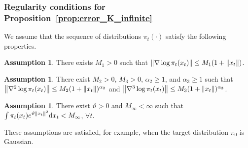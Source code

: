 \documentclass{article}
\theoremstyle{plain}
\theoremstyle{definition}
\newtheorem{assumption}[theorem]{Assumption}
\theoremstyle{remark}
\begin{document}
\subsubsection{Regularity conditions for Proposition~\ref{prop:error_K_infinite}}
\label{apx:regularity_conditions}
We assume that the sequence of distributions $\pi_t(\cdot)$ satisfy the following properties.
\begin{assumption}
	\label{asp:order1}
	There exists $M_1 > 0$ such that $\norm{\nabla\log \pi_t(x_t)} \leq M_1(1 + \norm{x_t})$.
\end{assumption}
\begin{assumption}
	\label{asp:order23}
	There exist $M_2 > 0$, $M_3 > 0$, $\alpha_2 \geq 1$, and $\alpha_3 \geq 1$ such that $\norm{\nabla^2\log \pi_t(x_t)} \leq M_2(1+\norm{x_t})^{\alpha_2}$ and $\norm{\nabla^3 \log\pi_t(x_t)} \leq M_3(1 + \norm{x_t})^{\alpha_3}$.
\end{assumption}
\begin{assumption}
	\label{asp:tail}
	There exist $\vartheta>0$ and $M_\infty < \infty$ such that $\int \pi_t(x_t) e^{\vartheta \norm{x_t}^2} \dd x_t < M_\infty$, $\forall t$.
\end{assumption}

These assumptions are satisfied, for example, when the target distribution $\pi_0$ is Gaussian.
\end{document}
